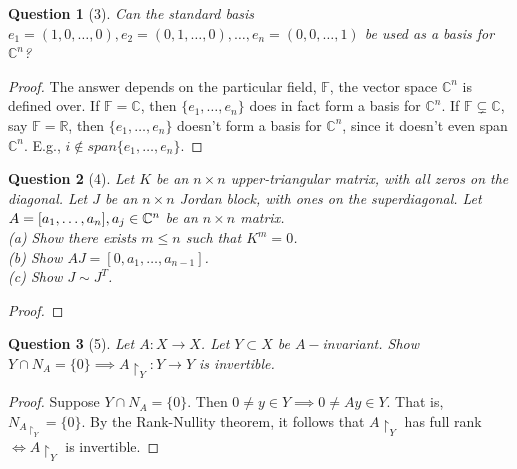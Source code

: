 \documentclass[11pt]{article}
\theoremstyle{quest}
\newtheorem*{question}{Question}
\begin{document}
\begin{question}[3]
Can the standard basis $e_1 = (1, 0, \ldots, 0), e_2 = (0, 1, \ldots, 0), \ldots, e_n = (0, 0, \ldots, 1)$ be used as a basis for $\mathbb{C}^n$?
\end{question}
\begin{proof}
The answer depends on the particular field, $\mathbb{F}$, the  vector space $\mathbb{C}^n$ is defined over. If $\mathbb{F} = \mathbb{C}$, then $\{e_1, \ldots, e_n\}$ does in fact form a basis for $\mathbb{C}^n$. If $\mathbb{F} \subsetneq \mathbb{C}$, say $\mathbb{F} = \mathbb{R}$, then $\{e_1, \ldots, e_n\}$ doesn't form a basis for $\mathbb{C}^n$, since it doesn't even span $\mathbb{C}^n$. E.g., $i \notin span\{e_1, \ldots, e_n\}$.
\end{proof}
\begin{question}[4]
Let $K$ be an $n \times n$ upper-triangular matrix, with all zeros on the diagonal. Let $J$ be an $n \times n$ Jordan block, with ones on the superdiagonal. Let $A = [a_1, \ldots, a_n], \\a_j \in \mathbb{C}^n$ be an $n \times n$ matrix.
\\(a) Show there exists $m \le n$ such that $K^m = 0$.
\\(b) Show $AJ = [0, a_1, \ldots, a_{n-1}]$.
\\(c) Show $J \sim J^T$.
\end{question}
\begin{proof}

\end{proof}
\begin{question}[5]
Let $A: X \rightarrow X$. Let $Y \subset X$ be $A-$invariant. Show $Y \cap N_A = \{0\} \implies A \restriction_Y: Y \rightarrow Y$ is invertible.
\end{question}
\begin{proof}
Suppose $Y \cap N_A = \{0\}$. Then $0 \ne y \in Y \implies 0 \ne Ay \in Y$. That is, $N_{A \restriction_Y} = \{0\}$. By the Rank-Nullity theorem, it follows that $A \restriction_Y$ has full rank $\iff A \restriction_Y$ is invertible.
\end{proof}
\end{document}
